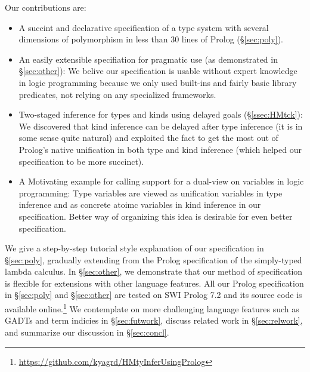 Our contributions are:
\begin{itemize}\vspace*{-1ex}
\item A succint and declarative specification of
	a type system with several dimensions of polymorphism
	in less than 30 lines of Prolog (\S\ref{sec:poly}).
\item An easily extensible specifiation for pragmatic use
	(as demonstrated in \S\ref{sec:other}):
We belive our specification is usable without expert knowledge
in logic programming because we only used built-ins and fairly basic
library predicates, not relying on any specialized frameworks.
\item Two-staged inference for types and kinds using delayed goals
	(\S\ref{ssec:HMtck}):
We discovered that kind inference can be delayed after type inference
(it is in some sense quite natural) and exploited the fact to get the
most out of Prolog's native unification in both type and kind inference
(which helped our specification to be more succinct).
\item A Motivating example for calling support for a dual-view
	on variables in logic programming:
Type variables are viewed as unification variables
in type inference and as concrete atoimc variables
in kind inference in our specification.
Better way of organizing this idea is desirable
for even better specification.
\end{itemize}

We give a step-by-step tutorial style explanation of our specification in
\S\ref{sec:poly}, gradually extending from the Prolog specification of
the simply-typed lambda calculus. In \S\ref{sec:other}, we demonstrate
that our method of specification is flexible for extensions with
other language features. All our Prolog specification in \S\ref{sec:poly}
and \S\ref{sec:other} are tested on SWI Prolog 7.2 and its source code is
available online.\footnote{
	\url{https://github.com/kyagrd/HMtyInferUsingProlog} }
We contemplate on more challenging language features such as GADTs and
term indicies in \S\ref{sec:futwork}, discuss related work in
\S\ref{sec:relwork}, and summarize our discussion in \S\ref{sec:concl}.




